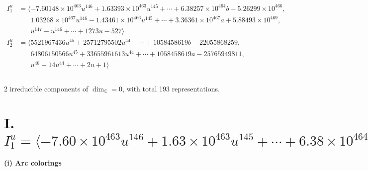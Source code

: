 \documentclass[1p]{elsarticle_modified}
\theoremstyle{definition}
\begin{document}
\begin{align*}
I^u_{1}&=\langle 
-7.60148\times10^{463} u^{146}+1.63393\times10^{463} u^{145}+\cdots+6.38257\times10^{464} b-5.26299\times10^{466},\\
\phantom{I^u_{1}}&\phantom{= \langle  }1.03268\times10^{467} u^{146}-1.43461\times10^{466} u^{145}+\cdots+3.36361\times10^{467} a+5.88493\times10^{469},\\
\phantom{I^u_{1}}&\phantom{= \langle  }u^{147}- u^{146}+\cdots+1273 u-527\rangle \\
I^u_{2}&=\langle 
5521967436 u^{45}+25712795502 u^{44}+\cdots+1058458619 b-22055868259,\\
\phantom{I^u_{2}}&\phantom{= \langle  }64806150566 u^{45}+33655961613 u^{44}+\cdots+1058458619 a-25765949811,\\
\phantom{I^u_{2}}&\phantom{= \langle  }u^{46}-14 u^{44}+\cdots+2 u+1\rangle \\
\\
\end{align*}
\raggedright * 2 irreducible components of $\dim_{\mathbb{C}}=0$, with total 193 representations.\\
\newpage
\renewcommand{\arraystretch}{1}
\centering \section*{I. $I^u_{1}= \langle -7.60\times10^{463} u^{146}+1.63\times10^{463} u^{145}+\cdots+6.38\times10^{464} b-5.26\times10^{466},\;1.03\times10^{467} u^{146}-1.43\times10^{466} u^{145}+\cdots+3.36\times10^{467} a+5.88\times10^{469},\;u^{147}- u^{146}+\cdots+1273 u-527 \rangle$}
\flushleft \textbf{(i) Arc colorings}\\
\end{document}
